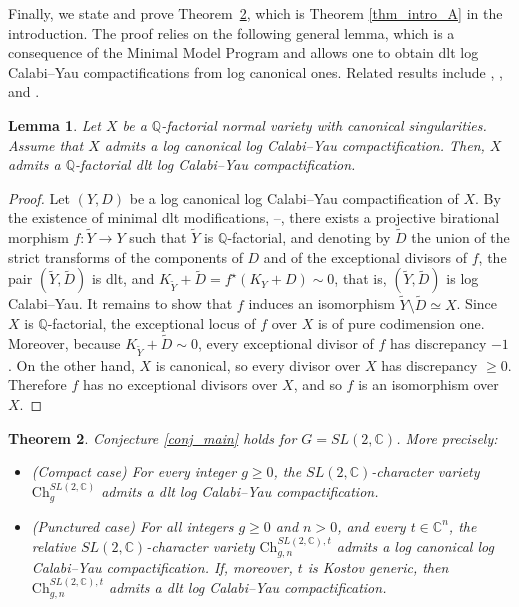 \documentclass[12pt,letterpaper, reqno]{amsart}
\newtheorem{theorem}{Theorem}[section]
\newtheorem{lemma}[theorem]{Lemma}
\theoremstyle{defstyle} \newtheorem{definition}[theorem]{Definition}
\theoremstyle{remark}
\numberwithin{equation}{section}
\numberwithin{figure}{section}
\newcommand{\CC} {\mathbb{C}}
\newcommand{\QQ} {\mathbb{Q}}
\begin{document}
Finally, we state and prove Theorem~\ref{thm_main_A}, which is Theorem \ref{thm_intro_A} in the introduction. The proof relies on the following general lemma, which is a consequence of the Minimal Model Program and allows one to obtain dlt log Calabi--Yau compactifications from log canonical ones. Related results include \cite[Theorem 3.1]{kollar_lc_du_bois}, \cite[Theorem 10.4]{fujino_fundamental}, and \cite[Lemma 4.3.1]{mauri2022geometric}.


\begin{lemma} \label{lem_dlt_modifications}
Let $X$ be a $\QQ$-factorial normal variety with canonical singularities. Assume that $X$ admits a log canonical log Calabi--Yau compactification. Then, $X$ admits a $\QQ$-factorial dlt log Calabi--Yau compactification.
\end{lemma}

\begin{proof}
Let $(Y,D)$ be a log canonical log Calabi--Yau compactification of $X$. By the existence of minimal dlt modifications, \cite[Theorem 3.1]{kollar_lc_du_bois}--\cite[Theorem 10.4]{fujino_fundamental}, there exists a projective birational morphism $f: \widetilde{Y} \rightarrow Y$ such that $\widetilde{Y}$ is $\QQ$-factorial, and denoting by $\widetilde{D}$ the union of the strict transforms of the components of $D$ and of the exceptional divisors of $f$, the pair $(\widetilde{Y}, \widetilde{D})$ is dlt, and $K_{\widetilde{Y}}+\widetilde{D} = f^\star(K_Y+D) \sim 0$, that is, $(\widetilde{Y}, \widetilde{D})$ is log Calabi--Yau. 
It remains to show that $f$ induces an isomorphism $\widetilde{Y}\setminus \widetilde{D}\simeq X$. Since $X$ is $\QQ$-factorial, the exceptional locus of $f$ over $X$ is of pure codimension one. Moreover, because $K_{\widetilde{Y}}+\widetilde{D}\sim 0$, every exceptional divisor of $f$ has discrepancy $-1$. On the other hand, $X$ is canonical, so every divisor over $X$ has discrepancy $\geq 0$. Therefore $f$ has no exceptional divisors over $X$, and so $f$ is an isomorphism over $X$.
\end{proof}

\begin{theorem} \label{thm_main_A}
Conjecture \ref{conj_main} holds for $G=SL(2,\CC)$. More precisely:
\begin{itemize}
\item[(i)] \emph{(Compact case)}
For every integer $g\geq 0$, the $SL(2,\CC)$-character variety $\mathrm{Ch}_g^{SL(2,\CC)}$ admits a dlt log Calabi--Yau compactification.

\item[(ii)] \emph{(Punctured case)}
For all integers $g\geq 0$ and $n>0$, and every $t\in\CC^n$, the relative $SL(2,\CC)$-character variety $\mathrm{Ch}_{g,n}^{SL(2,\CC),t}$ admits a log canonical log Calabi--Yau compactification. If, moreover, $t$ is Kostov generic, then $\mathrm{Ch}_{g,n}^{SL(2,\CC),t}$ admits a dlt log Calabi--Yau compactification.
\end{itemize}
\end{theorem}
\end{document}
